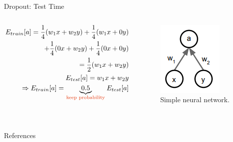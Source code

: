 \documentclass[compress,oilve,t]{beamer}
\newcommand{\tc}[2]{
	\textcolor{#1}{\hspace{-2pt}#2\hspace{-2pt}}
}
\begin{document}
\begin{frame}{Dropout: Test Time}
	\begin{columns}
		\begin{column}{0.5\textwidth}
			\begin{align*}
				E_{train}[a] = \frac{1}{4}(w_1 x + w_2 y)
				+ \frac{1}{4}(w_1 x + 0 y) \\
				+ \frac{1}{4}(0 x + w_2 y) + \frac{1}{4}(0 x + 0 y) \\
				= \frac{1}{2}(w_1 x + w_2 y) \\
				E_{test}[a] = w_1 x + w_2 y \\
				\Rightarrow E_{train}[a] = \underbrace{0.5}_{\text{\tc{keywords}{keep probability}}} E_{test}[a]
			\end{align*}
		\end{column}
		\begin{column}{0.5\textwidth}
			\begin{figure}[H]
				\centering
				\includegraphics[height=0.4\textheight]{Figs/section_4/dropout_test.png}
				\caption{Simple neural network. \cite{cs231n-2018-lecture7}}
			\end{figure}
		\end{column}
	\end{columns}
\end{frame}


\section{}


\begin{frame}{References}

\end{frame}
\end{document}
